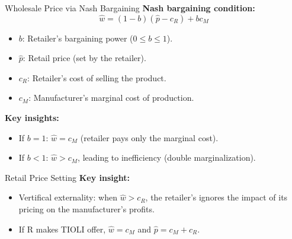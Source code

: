 \documentclass[aspectratio=169]{beamer}  %
\begin{document}
\begin{frame}{Wholesale Price via Nash Bargaining}
    \textbf{Nash bargaining condition:}
    \[
    \hat{w} = (1-b)(\hat{p} - c_R) + b c_M
    \]
    \begin{itemize}
        \item \(b\): Retailer's bargaining power (\(0 \leq b \leq 1\)).
        \item \(\hat{p}\): Retail price (set by the retailer).
        \item \(c_R\): Retailer's cost of selling the product.
        \item \(c_M\): Manufacturer's marginal cost of production.
    \end{itemize}
    \vspace{0.5cm}
    \textbf{Key insights:}
    \begin{itemize}
        \item If \(b = 1\): \(\hat{w} = c_M\) (retailer pays only the marginal cost).
        \item If \(b < 1\): \(\hat{w} > c_M\), leading to inefficiency (double marginalization).
    \end{itemize}
\end{frame}

\begin{frame}{Retail Price Setting}
    \textbf{Key insight:}
    \begin{itemize}
        \item Vertifical externality: when $\hat{w} > c_R$, the retailer's ignores the impact of its pricing on the manufacturer's profits.
        \item If R makes TIOLI offer, $\hat{w} = c_M$ and $\hat{p} = c_M + c_R$.
    \end{itemize}
\end{frame}
\end{document}
